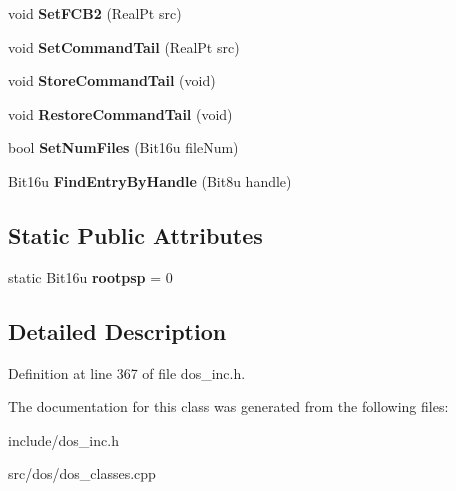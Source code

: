 \begin{DoxyCompactItemize}
\item 
\hypertarget{classDOS__PSP_a4c0066046f23c2d51f36da5f31749299}{void {\bfseries Set\-F\-C\-B2} (Real\-Pt src)}\label{classDOS__PSP_a4c0066046f23c2d51f36da5f31749299}

\item 
\hypertarget{classDOS__PSP_a513c55126b7b22f3fa587f005cbade46}{void {\bfseries Set\-Command\-Tail} (Real\-Pt src)}\label{classDOS__PSP_a513c55126b7b22f3fa587f005cbade46}

\item 
\hypertarget{classDOS__PSP_a668f1449f7b9ca976e87d19f70f3e92d}{void {\bfseries Store\-Command\-Tail} (void)}\label{classDOS__PSP_a668f1449f7b9ca976e87d19f70f3e92d}

\item 
\hypertarget{classDOS__PSP_a8fb6c2a0b1af5e5898356e759119722d}{void {\bfseries Restore\-Command\-Tail} (void)}\label{classDOS__PSP_a8fb6c2a0b1af5e5898356e759119722d}

\item 
\hypertarget{classDOS__PSP_ac5a10428bbb82e178e67350935882c76}{bool {\bfseries Set\-Num\-Files} (Bit16u file\-Num)}\label{classDOS__PSP_ac5a10428bbb82e178e67350935882c76}

\item 
\hypertarget{classDOS__PSP_a94aa51f3b9eef379d2fbcaf025206a86}{Bit16u {\bfseries Find\-Entry\-By\-Handle} (Bit8u handle)}\label{classDOS__PSP_a94aa51f3b9eef379d2fbcaf025206a86}

\end{DoxyCompactItemize}
\subsection*{Static Public Attributes}
\begin{DoxyCompactItemize}
\item 
\hypertarget{classDOS__PSP_ad46b74f756dae06941329a205ab482fd}{static Bit16u {\bfseries rootpsp} = 0}\label{classDOS__PSP_ad46b74f756dae06941329a205ab482fd}

\end{DoxyCompactItemize}


\subsection{Detailed Description}


Definition at line 367 of file dos\-\_\-inc.\-h.



The documentation for this class was generated from the following files\-:\begin{DoxyCompactItemize}
\item 
include/dos\-\_\-inc.\-h\item 
src/dos/dos\-\_\-classes.\-cpp\end{DoxyCompactItemize}
